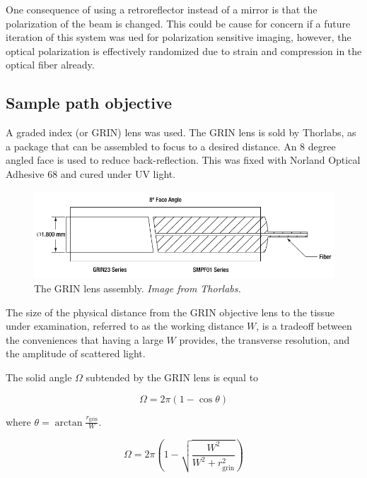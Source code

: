 One consequence of using a retroreflector instead of a mirror is that the polarization of the beam is changed. This could be cause for concern if a future iteration of this system was ued for polarization sensitive imaging, however, the optical polarization is effectively randomized due to strain and compression in the optical fiber already.

\subsection{Sample path objective}

A graded index (or GRIN) lens was used. The GRIN lens is sold by Thorlabs, as a package that can be assembled to focus to a desired distance. An 8 degree angled face is used to reduce back-reflection. This was fixed with Norland Optical Adhesive 68 and cured under UV light.

\begin{figure}[h!]
\centering
\includegraphics[width=1.0\textwidth]{Images/System/grin_angled.png}
\caption[The GRIN lens assembly.]{The GRIN lens assembly. \em{Image from Thorlabs.} \label{fig:grin_assembly}}
\end{figure}

The size of the physical distance from the GRIN objective lens to the tissue under examination, referred to as the working distance $W$, is a tradeoff between the conveniences that having a large $W$ provides, the  transverse resolution, and the amplitude of scattered light.


The solid angle $\Omega$ subtended by the GRIN lens is equal to

\begin{equation}
\Omega = 2 \pi (1 - \cos{\theta})
\end{equation}

where $\theta = \arctan{\frac{r_{\mathrm{grin}}}{W}}$.

\begin{equation}
\Omega = 2 \pi \left(1 - \sqrt{\frac{W^2}{W^2 + r_{\mathrm{grin}}^2}} \right)
\end{equation}


